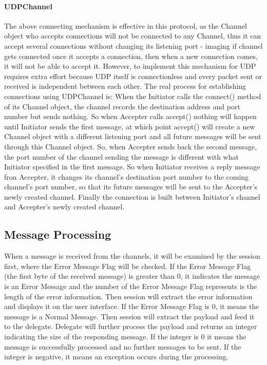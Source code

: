 \paragraph{UDPChannel}
The above connecting mechanism is effective in this protocol, as the Channel object who accepts connections will not be connected to any Channel, thus it can accept several connections without changing its listening port - imaging if channel gets connected once it accepts a connection, then when a new connection comes, it will not be able to accept it. However, to implement this mechanism for UDP requires extra effort because UDP itself is connectionless and every packet sent or received is independent between each other. The real process for establishing connections using UDPChannel is: When the Initiator calls the connect() method of its Channel object, the channel records the destination address and port number but sends nothing. So when Accepter calls accept() nothing will happen until Initiator sends the first message, at which point accept() will create a new Channel object with a different listening port and all future messages will be sent through this Channel object. So, when Accepter sends back the second message, the port number of the channel sending the message is different with what Initiator specified in the first message. So when Initiator receives a reply message fron Accepter, it changes its channel's destination port number to the coming channel's port number, so that its future messages will be sent to the Accepter's newly created channel. Finally the connection is built between Initiator's channel and Accepter's newly created channel.

\subsection{Message Processing}
When a message is received from the channels, it will be examined by the session first, where the Error Message Flag will be checked. If the Error Message Flag (the first byte of the received message) is greater than 0, it indicates the message is an Error Message and the number of the Error Message Flag represents is the length of the error information. Then session will extract the error information and displays it on the user interface. If the Error Message Flag is 0, it means the message is a Normal Message. Then session will extract the payload and feed it to the delegate. Delegate will further process the payload and returns an integer indicating the size of the responding message. If the integer is 0 it means the message is successfully processed and no further messages to be sent. If the integer is negative, it means an exception occurs during the processing.


